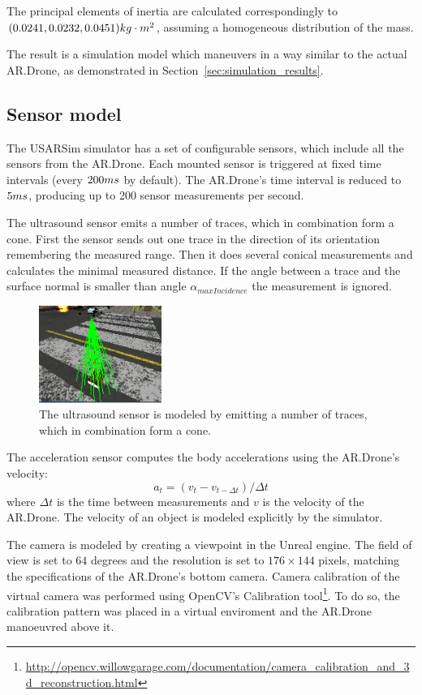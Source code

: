 The principal elements of inertia are calculated correspondingly to $(0.0241, 0.0232, 0.0451)\small{kg\cdot m^2}$, assuming a homogeneous distribution of the mass.

The result is a simulation model which maneuvers in a way similar to the actual AR.Drone, as demonstrated in Section~\ref{sec:simulation_results}.


		\subsection{Sensor model}
The USARSim simulator has a set of configurable sensors, which include all the sensors from the AR.Drone.
Each mounted sensor is triggered at fixed time intervals (every $200\small{ms}$ by default).
The AR.Drone's time interval is reduced to $5\small{ms}$, producing up to 200 sensor measurements per second.

The ultrasound sensor emits a number of traces, which in combination form a cone.
First the sensor sends out one trace in the direction of its orientation remembering the measured range.
Then it does several conical measurements and calculates the minimal measured distance.
If the angle between a trace and the surface normal is smaller than angle $\alpha_{maxIncidence}$ the measurement is ignored.

\begin{figure}[htb!]
\centering
\includegraphics[width=4cm]{images/usarsim_sonar_fixed.png}
\caption{The ultrasound sensor is modeled by emitting a number of traces, which in combination form a cone.} 
\label{fig:3Dmodel}
\end{figure}


The acceleration sensor computes the body accelerations using the AR.Drone's velocity:
\begin{equation}
a_{t} = (v_{t} - v_{t-\Delta t}) / \Delta t
\end{equation}
where $\Delta t$ is the time between measurements and $v$ is the velocity of the AR.Drone. The velocity of an object is modeled explicitly by the simulator.

The camera is modeled by creating a viewpoint in the Unreal engine.
The field of view is set to $64$ degrees and the resolution is set to $176 \times 144$ pixels, matching the specifications of the AR.Drone's bottom camera.
Camera calibration of the virtual camera was performed using OpenCV's Calibration tool\footnote{\url{http://opencv.willowgarage.com/documentation/camera_calibration_and_3d_reconstruction.html}}.
To do so, the calibration pattern was placed in a virtual enviroment and the AR.Drone manoeuvred above it.

